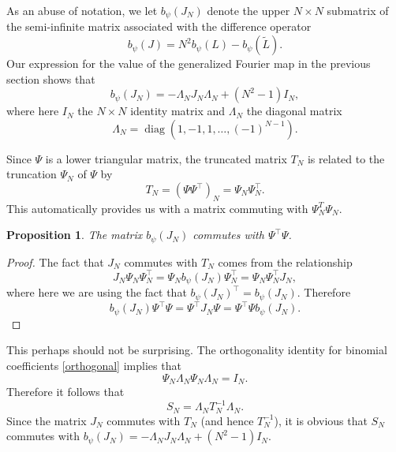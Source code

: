 \documentclass[11pt]{amsart}
\theoremstyle{plain}
\newtheorem{proposition}[theorem]{Proposition}
\theoremstyle{named}
\def \wt {\widetilde}
\DeclareMathOperator \diag { {\mathrm{diag}} }
\begin{document}
As an abuse of notation, we let $b_\psi(J_N)$ denote the upper $N\times N$ submatrix of the semi-infinite matrix associated with the difference operator
$$b_\psi(J)=N^2b_\psi(L)-b_\psi(\wt L).$$%
Our expression for the value of the generalized Fourier map in the previous section shows that
\begin{equation}\label{bJ}
    b_\psi(J_N) = -\Lambda_N J_N \Lambda_N + (N^2-1)I_N,
\end{equation}
where here $I_N$ the $N\times N$ identity matrix and $\Lambda_N$ the diagonal matrix
$$\Lambda_N = \diag(1,-1,1,\dots,(-1)^{N-1}).$$

Since $\Psi$ is a lower triangular matrix, the truncated matrix $T_N$ is related to the truncation $\Psi_N$ of $\Psi$ by
$$T_N = (\Psi\Psi^\intercal)_N = \Psi_N\Psi_N^\intercal.$$
This automatically provides us with a matrix commuting with $\Psi_N^T\Psi_N$.
\begin{proposition}
The matrix $b_\psi(J_N)$ commutes with $\Psi^\intercal\Psi$.
\end{proposition}
\begin{proof}
The fact that $J_N$ commutes with $T_N$ comes from the relationship
$$J_N\Psi_N\Psi_N^\intercal = \Psi_N b_\psi(J_N)\Psi_N^\intercal = \Psi_N\Psi_N^\intercal J_N,$$
where here we are using the fact that $b_\psi(J_N)^\intercal = b_\psi(J_N)$.
Therefore
$$b_\psi(J_N)\Psi^\intercal\Psi =  \Psi^\intercal J_N\Psi = \Psi^\intercal\Psi b_\psi(J_N).$$
\end{proof}
This perhaps should not be surprising.
The orthogonality identity for binomial coefficients \eqref{orthogonal} implies that 
\begin{equation}\label{inv}
    \Psi_N\Lambda_N\Psi_N\Lambda_N=I_N.
\end{equation}
Therefore it follows that
$$S_N = \Lambda_N T_N^{-1}\Lambda_N.$$
Since the matrix $J_N$ commutes with $T_N$ (and hence $T_N^{-1}$), it is obvious that $S_N$ commutes with $b_\psi(J_N)=-\Lambda_NJ_N\Lambda_N + (N^2-1)I_N$.
\end{document}
